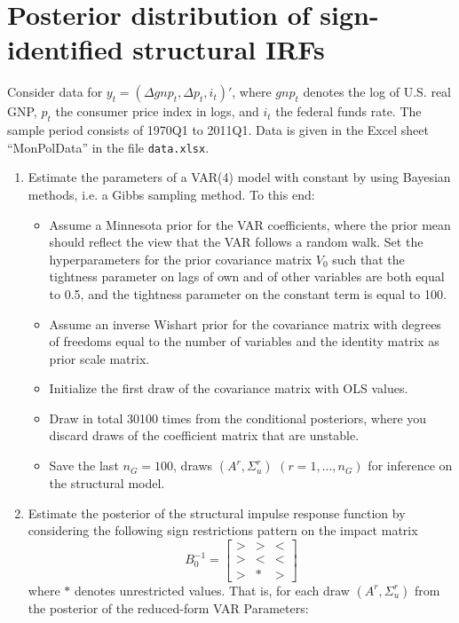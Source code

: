 \documentclass{article}
\begin{document}
\newpage
\section{Posterior distribution of sign-identified structural IRFs}
Consider data for $y_t = (\Delta gnp_t,\Delta p_t,i_t)'$, where $gnp_t$ denotes the log of U.S. real GNP, $p_t$ the consumer price index in logs, and $i_t$ the federal funds rate. The sample period consists of 1970Q1 to 2011Q1.  Data is given in the Excel sheet \enquote{MonPolData} in the file \texttt{data.xlsx}.

\begin{enumerate}
	\item Estimate the parameters of a VAR(4) model with constant by using Bayesian methods, i.e. a Gibbs sampling method. To this end:
	\begin{itemize}
		\item Assume a Minnesota prior for the VAR coefficients, where the prior mean should reflect the view that the VAR follows a random walk. Set the hyperparameters for the prior covariance matrix $V_0$ such that the tightness parameter on lags of own and of other variables are both equal to 0.5, and the tightness parameter on the constant term is equal to 100. 
		\item Assume an inverse Wishart prior for the covariance matrix with degrees of freedoms equal to the number of variables and the identity matrix as prior scale matrix.
		\item Initialize the first draw of the covariance matrix with OLS values.
		\item Draw in total 30100 times from the conditional posteriors, where you discard draws of the coefficient matrix that are unstable.
		\item Save the last $n_{G}=100$, draws $(A^{r},\Sigma_u^{r})$ $(r=1,...,n_G)$ for inference on the structural model.
	\end{itemize}
	\item Estimate the posterior of the structural impulse response function by considering the following sign restrictions pattern on the impact matrix
		$$ B_0^{-1}=\begin{bmatrix}
		> & > & <\\
		> & < & <\\
		> & *  & >
		\end{bmatrix}$$
		 where $*$ denotes unrestricted values. That is, for each draw $(A^{r},\Sigma_u^{r})$ from the posterior of the reduced-form VAR Parameters:
		\begin{itemize}

\end{itemize}
\end{enumerate}
\end{document}
